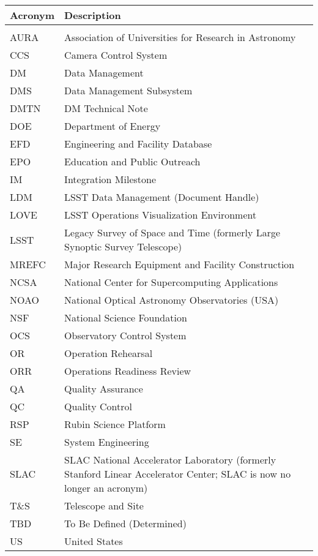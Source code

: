 \addtocounter{table}{-1}
\begin{longtable}{p{}p{}}\hline
\textbf{Acronym} & \textbf{Description}  \\\hline

 &  \\\hline
AURA & Association of Universities for Research in Astronomy \\\hline
CCS & Camera Control System \\\hline
DM & Data Management \\\hline
DMS & Data Management Subsystem \\\hline
DMTN & DM Technical Note \\\hline
DOE & Department of Energy \\\hline
EFD & Engineering and Facility Database \\\hline
EPO & Education and Public Outreach \\\hline
IM & Integration Milestone \\\hline
LDM & LSST Data Management (Document Handle) \\\hline
LOVE & LSST Operations Visualization Environment \\\hline
LSST & Legacy Survey of Space and Time (formerly Large Synoptic Survey Telescope) \\\hline
MREFC & Major Research Equipment and Facility Construction \\\hline
NCSA & National Center for Supercomputing Applications \\\hline
NOAO & National Optical Astronomy Observatories (USA) \\\hline
NSF & National Science Foundation \\\hline
OCS & Observatory Control System \\\hline
OR & Operation Rehearsal \\\hline
ORR & Operations Readiness Review \\\hline
QA & Quality Assurance \\\hline
QC & Quality Control \\\hline
RSP & Rubin Science Platform \\\hline
SE & System Engineering \\\hline
SLAC & SLAC National Accelerator Laboratory (formerly Stanford Linear Accelerator Center; SLAC is now no longer an acronym) \\\hline
T\&S & Telescope and Site \\\hline
TBD & To Be Defined (Determined) \\\hline
US & United States \\\hline
\end{longtable}
